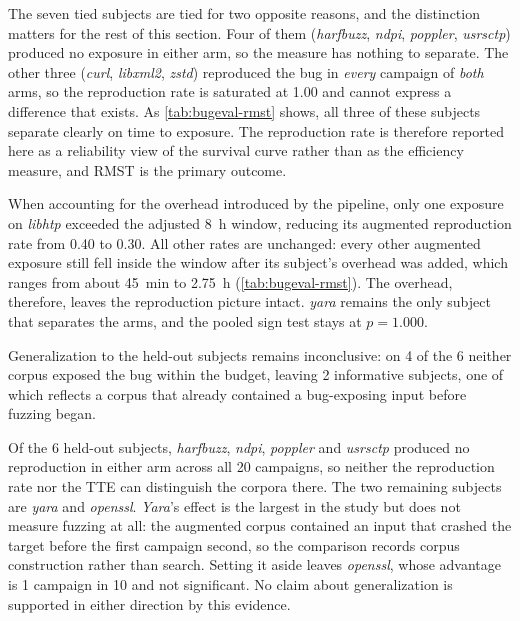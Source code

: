 The seven tied subjects are tied for two opposite reasons, and the distinction matters for the rest of this section.
Four of them (\emph{harfbuzz}, \emph{ndpi}, \emph{poppler}, \emph{usrsctp}) produced no exposure in either arm, so the measure has nothing to separate.
The other three (\emph{curl}, \emph{libxml2}, \emph{zstd}) reproduced the bug in \emph{every} campaign of \emph{both} arms, so the reproduction rate is saturated at \num{1.00} and cannot express a difference that exists.
As \cref{tab:bugeval-rmst} shows, all three of these subjects separate clearly on time to exposure.
The reproduction rate is therefore reported here as a reliability view of the survival curve rather than as the efficiency measure, and \ac{RMST} is the primary outcome.

When accounting for the overhead introduced by the pipeline, only one exposure on \emph{libhtp} exceeded the adjusted \SI{8}{\hour} window, reducing its augmented reproduction rate from \num{0.40} to \num{0.30}.
All other rates are unchanged: every other augmented exposure still fell inside the window after its subject's overhead was added, which ranges from about \SI{45}{\minute} to \SI{2.75}{\hour} (\cref{tab:bugeval-rmst}).
The overhead, therefore, leaves the reproduction picture intact.
\emph{yara} remains the only subject that separates the arms, and the pooled sign test stays at $p = \num{1.000}$.

\begin{tcolorbox}[colback=black!4, colframe=black!40, boxrule=0.4pt,
                  left=6pt, right=6pt, top=6pt, bottom=6pt]
 Generalization to the held-out subjects remains inconclusive: on \num{4} of the \num{6} neither corpus exposed the bug within the budget, leaving \num{2} informative subjects, one of which reflects a corpus that already contained a bug-exposing input before fuzzing began.
\end{tcolorbox}

Of the \num{6} held-out subjects, \emph{harfbuzz}, \emph{ndpi}, \emph{poppler} and \emph{usrsctp} produced no reproduction in either arm across all \num{20} campaigns, so neither the reproduction rate nor the \ac{TTE} can distinguish the corpora there.
The two remaining subjects are \emph{yara} and \emph{openssl}.
\emph{Yara}'s effect is the largest in the study but does not measure fuzzing at all: the augmented corpus contained an input that crashed the target before the first campaign second, so the comparison records corpus construction rather than search.
Setting it aside leaves \emph{openssl}, whose advantage is \num{1} campaign in \num{10} and not significant.
No claim about generalization is supported in either direction by this evidence.

